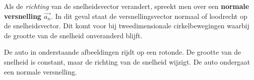 \documentclass{ximera}
\begin{document}
\begin{definition}
Als de \textit{richting} van de snelheidsvector verandert, spreekt men over een \textbf{normale versnelling \(\vec{a_n}\)}. 
In dit geval staat de versnellingsvector normaal of loodrecht op de snelheidsvector. Dit komt voor bij tweedimensionale cirkelbewegingen waarbij de grootte van de snelheid onveranderd blijft.
\end{definition}

\begin{example}
De auto in onderstaande afbeeldingen rijdt op een rotonde. De grootte van de snelheid is constant, maar de richting van de snelheid wijzigt. 
De auto ondergaat een normale versnelling. 

\begin{image}
	
\end{image}
\end{example}
\end{document}
